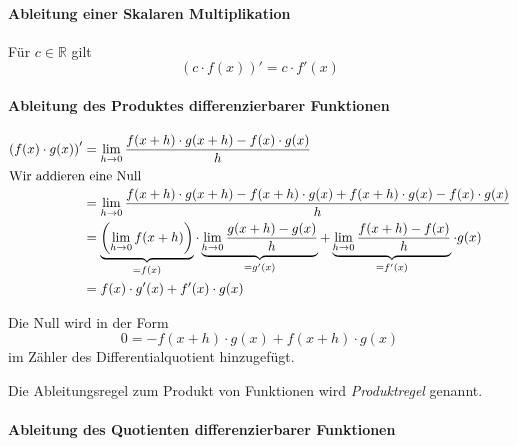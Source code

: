 \paragraph{Ableitung einer Skalaren Multiplikation}
Für $c\in \mathbb{R}$ gilt
\begin{equation}
\left(c\cdot f(x)\right)' = c \cdot f'(x)
\end{equation}

\paragraph{Ableitung des Produktes differenzierbarer Funktionen}
\begin{equation}
\begin{split}
\left(f(x) \cdot g(x) \right)' &= \lim\limits_{h\rightarrow 0} \frac{f(x+h)\cdot g(x+h)-f(x)\cdot g(x)}{h} \\
\intertext{Wir addieren eine Null}
&= \lim\limits_{h\rightarrow 0} \frac{f(x+h)\cdot g(x+h) -f(x+h)\cdot g(x)+f(x+h)\cdot g(x) - f(x)\cdot g(x)}{h} \\
&= \underbrace{\left( \lim\limits_{h\rightarrow 0}f(x+h)\right)}_{=f(x)} \cdot 
\underbrace{\lim\limits_{h\rightarrow 0} \frac{g(x+h)-g(x)}{h}}_{=g'(x)} +\underbrace{\lim\limits_{h\rightarrow 0} \frac{f(x+h)-f(x)}{h}}_{=f'(x)} \cdot g(x)\\
&= f(x)\cdot g'(x) + f'(x)\cdot g(x)
\end{split}
\end{equation}

\noindent Die Null wird in der Form
\begin{equation*}
0 = -f(x+h)\cdot g(x)+f(x+h)\cdot g(x)
\end{equation*}
im Zähler des Differentialquotient hinzugefügt.

\begin{definition}
Die Ableitungsregel zum Produkt von Funktionen wird \emph{Produktregel} genannt.
\end{definition}

\paragraph{Ableitung des Quotienten differenzierbarer Funktionen}

